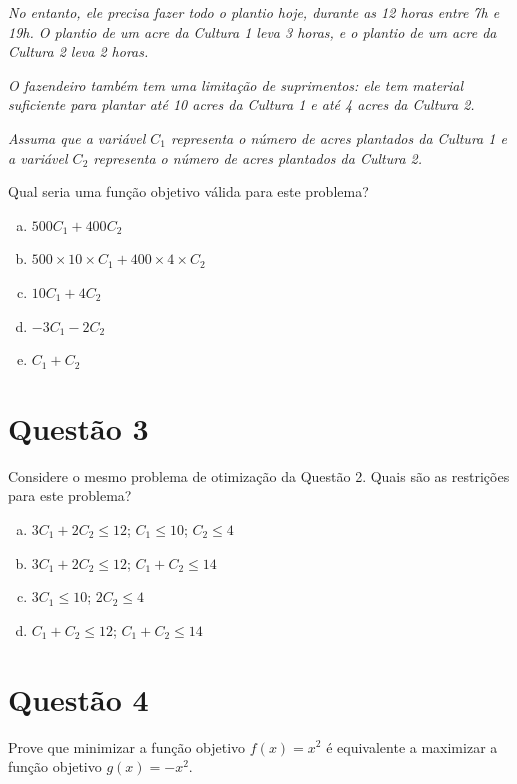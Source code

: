 \documentclass{article}
\begin{document}
\textit{No entanto, ele precisa fazer todo o plantio hoje, durante as 12 horas entre 7h e 19h. O plantio de um acre da Cultura 1 leva 3 horas, e o plantio de um acre da Cultura 2 leva 2 horas.}

\textit{O fazendeiro também tem uma limitação de suprimentos: ele tem material suficiente para plantar até 10 acres da Cultura 1 e até 4 acres da Cultura 2.}

\textit{Assuma que a variável \(C_1\) representa o número de acres plantados da Cultura 1 e a variável \(C_2\) representa o número de acres plantados da Cultura 2.}

Qual seria uma função objetivo válida para este problema?

\begin{enumerate}[a)]
    \item \( 500 C_1 + 400 C_2 \)
    \item \( 500 \times 10 \times C_1 + 400 \times 4 \times C_2 \)
    \item \( 10 C_1 + 4 C_2 \)
    \item \( -3 C_1 - 2 C_2 \)
    \item \( C_1 + C_2 \)
\end{enumerate}



\section*{Questão 3}

Considere o mesmo problema de otimização da Questão 2. Quais são as restrições para este problema?

\begin{enumerate}[a)]
    \item \( 3C_1 + 2C_2 \leq 12 \); \( C_1 \leq 10 \); \( C_2 \leq 4 \)
    \item \( 3C_1 + 2C_2 \leq 12 \); \( C_1 + C_2 \leq 14 \)
    \item \( 3C_1 \leq 10 \); \( 2C_2 \leq 4 \)
    \item \( C_1 + C_2 \leq 12 \); \( C_1 + C_2 \leq 14 \)
\end{enumerate}


\section*{Questão 4}

Prove que minimizar a função objetivo \( f(x) = x^2 \) é equivalente a maximizar a função objetivo \( g(x) = -x^2 \).
\end{document}
